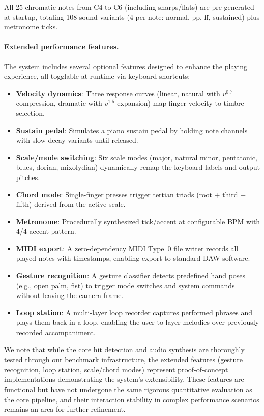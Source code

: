 \documentclass[11pt,a4paper]{article}
\begin{document}
All 25 chromatic notes from C4 to C6 (including sharps/flats) are pre-generated at startup, totaling 108 sound variants (4 per note: normal, pp, ff, sustained) plus metronome ticks.

\paragraph{Extended performance features.}
The system includes several optional features designed to enhance the playing experience, all togglable at runtime via keyboard shortcuts:

\begin{itemize}[nosep]
    \item \textbf{Velocity dynamics}: Three response curves (linear, natural with $v^{0.7}$ compression, dramatic with $v^{1.5}$ expansion) map finger velocity to timbre selection.
    \item \textbf{Sustain pedal}: Simulates a piano sustain pedal by holding note channels with slow-decay variants until released.
    \item \textbf{Scale/mode switching}: Six scale modes (major, natural minor, pentatonic, blues, dorian, mixolydian) dynamically remap the keyboard labels and output pitches.
    \item \textbf{Chord mode}: Single-finger presses trigger tertian triads (root + third + fifth) derived from the active scale.
    \item \textbf{Metronome}: Procedurally synthesized tick/accent at configurable BPM with 4/4 accent pattern.
    \item \textbf{MIDI export}: A zero-dependency MIDI Type~0 file writer records all played notes with timestamps, enabling export to standard DAW software.
    \item \textbf{Gesture recognition}: A gesture classifier detects predefined hand poses (e.g., open palm, fist) to trigger mode switches and system commands without leaving the camera frame.
    \item \textbf{Loop station}: A multi-layer loop recorder captures performed phrases and plays them back in a loop, enabling the user to layer melodies over previously recorded accompaniment.
\end{itemize}

We note that while the core hit detection and audio synthesis are thoroughly tested through our benchmark infrastructure, the extended features (gesture recognition, loop station, scale/chord modes) represent proof-of-concept implementations demonstrating the system's extensibility. These features are functional but have not undergone the same rigorous quantitative evaluation as the core pipeline, and their interaction stability in complex performance scenarios remains an area for further refinement.
\end{document}
